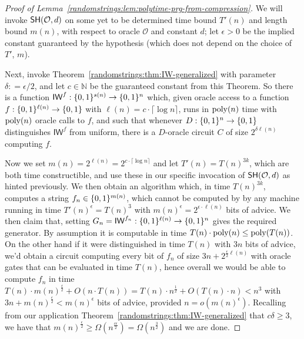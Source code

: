 \begin{proof}[Proof of Lemma~\ref{randomstrings:lem:polytime-prg-from-compression}]
We will invoke $\mathsf{SH}(\mathcal{O},d)$ on some yet to be determined time bound $T'(n)$ and length bound $m(n)$, with respect to oracle $\mathcal{O}$ and constant $d$; let $\epsilon > 0$ be the implied constant guaranteed by the hypothesis (which does not depend on the choice of $T'$, $m$).

Next, invoke Theorem~\ref{randomstrings:thm:IW-generalized} with parameter $\delta: = \epsilon/2$, and let $c \in \mathbb{N}$ be the guaranteed constant from this Theorem. So there is a function $\mathsf{IW}^f: \{0,1\}^{s(n)} \to \{0,1\}^n$ which, given oracle access to a function $f: \{0,1\}^{\ell(n)} \to \{0,1\}$ with $\ell(n) = c \cdot \lceil \log n \rceil $, runs in $\mathrm{poly}(n)$ time with $\mathrm{poly}(n)$ oracle calls to $f$, and such that whenever $D: \{0,1\}^n \to \{0,1\}$ distinguishes $\mathsf{IW}^f$ from uniform, there is a $D$-oracle circuit $C$ of size $2^{\delta \ell(n)}$ computing $f$. 

Now we set $m(n) = 2^{\ell(n)} = 2^{c \cdot \lceil \log n \rceil}$ and let $T'(n) = T(n)^{3k}$, which are both time constructible, and use these in our specific invocation of $\mathsf{SH}(\mathcal{O},d)$ as hinted previously. We then obtain an algorithm which, in time $T(n)^{3k}$, computes a string $f_n \in \{0,1\}^{m(n)}$, which cannot be computed by by any machine running in time $T'(n)^{\epsilon} = T(n)^3$ with $m(n)^{\epsilon} = 2^{\epsilon \cdot \ell(n)}$ bits of advice. We then claim that, setting $G_n = \mathsf{IW}^{f_n}: \{0,1\}^{\ell(n)} \to \{0,1\}^n$ gives the required generator. By assumption it is computable in time $T(n) \cdot \mathrm{poly}(n) \leq \mathrm{poly}(T(n))$. On the other hand if it were distinguished in time $T(n)$ with $3n$ bits of advice, we'd obtain a circuit computing every bit of $f_n$ of size $3n + 2^{\frac{\epsilon}{2} \ell(n)}$ with oracle gates that can be evaluated in time $T(n)$, hence overall we would be able to compute $f_n$ in time $T(n) \cdot m(n)^{\frac{\epsilon}{2}} + O(n \cdot T(n)) = T(n) \cdot n^{\frac{1}{2}} + O(T(n) \cdot n) < n^3$ with $3n + m(n)^{\frac{\epsilon}{2}} < m(n)^{\epsilon}$ bits of advice, provided $n  = o(m(n)^{\epsilon})$. Recalling from our application Theorem~\ref{randomstrings:thm:IW-generalized} that $c \delta \geq 3$, we have that $m(n)^{\frac{\epsilon}{2}} \geq \Omega(n^{\frac{c\epsilon}{2}})  = \Omega(n^{\frac{3}{2}})$ and we are done.
\end{proof}


